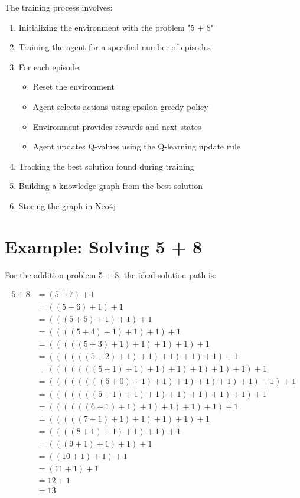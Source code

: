 \documentclass{article}
\begin{document}
The training process involves:
\begin{enumerate}
    \item Initializing the environment with the problem "5 + 8"
    \item Training the agent for a specified number of episodes
    \item For each episode:
        \begin{itemize}
            \item Reset the environment
            \item Agent selects actions using epsilon-greedy policy
            \item Environment provides rewards and next states
            \item Agent updates Q-values using the Q-learning update rule
        \end{itemize}
    \item Tracking the best solution found during training
    \item Building a knowledge graph from the best solution
    \item Storing the graph in Neo4j
\end{enumerate}

\section{Example: Solving 5 + 8}

For the addition problem 5 + 8, the ideal solution path is:

\begin{align}
5 + 8 &= (5 + 7) + 1 \\
&= ((5 + 6) + 1) + 1 \\
&= (((5 + 5) + 1) + 1) + 1 \\
&= ((((5 + 4) + 1) + 1) + 1) + 1 \\
&= (((((5 + 3) + 1) + 1) + 1) + 1) + 1 \\
&= ((((((5 + 2) + 1) + 1) + 1) + 1) + 1) + 1 \\
&= (((((((5 + 1) + 1) + 1) + 1) + 1) + 1) + 1) + 1 \\
&= ((((((((5 + 0) + 1) + 1) + 1) + 1) + 1) + 1) + 1) + 1 \\
&= (((((((5 + 1) + 1) + 1) + 1) + 1) + 1) + 1) + 1 \\
&= ((((((6 + 1) + 1) + 1) + 1) + 1) + 1) + 1 \\
&= (((((7 + 1) + 1) + 1) + 1) + 1) + 1 \\
&= ((((8 + 1) + 1) + 1) + 1) + 1 \\
&= (((9 + 1) + 1) + 1) + 1 \\
&= ((10 + 1) + 1) + 1 \\
&= (11 + 1) + 1 \\
&= 12 + 1 \\
&= 13
\end{align}
\end{document}
